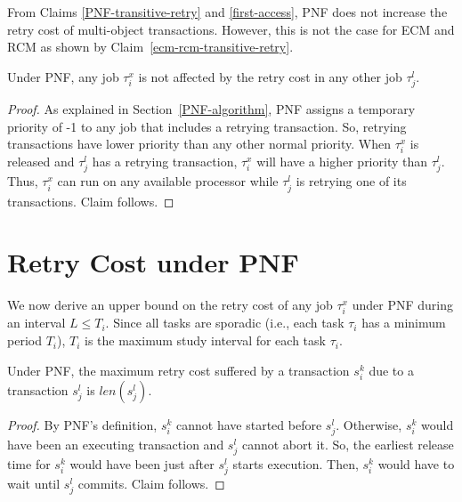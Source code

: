 From Claims \ref{PNF-transitive-retry} and \ref{first-access}, PNF does not increase the retry cost of multi-object transactions. However, this is not the case for ECM and RCM as shown by Claim~\ref{ecm-rcm-transitive-retry}. 

\begin{clm}\label{higher retry does not affect response}
Under PNF, any job $\tau_{i}^{x}$ is not affected by the retry cost in any other
job $\tau_{j}^{l}$.
\end{clm}
\begin{proof}\normalfont
As explained in Section~\ref{PNF-algorithm}, PNF assigns a temporary priority of -1 to any job that includes a retrying transaction. So, retrying transactions have lower priority than any other normal priority.
When $\tau_{i}^{x}$ is released and $\tau_j^l$ has a retrying transaction, $\tau_i^x$ will have a higher priority
than $\tau_j^l$. Thus, $\tau_i^x$ can run on any available processor while $\tau_j^l$ is retrying one of its transactions. Claim follows.
\end{proof}


\section{Retry Cost under PNF}\label{rc pnf sec}

We now derive an upper bound on the retry cost of any job $\tau_i^x$ under PNF during an interval $L\le T_i$. Since all tasks are sporadic (i.e., each task $\tau_i$ has a minimum period $T_i$), $T_i$ is the maximum study interval for each task $\tau_i$.

\begin{clm}\label{two transactions retry cost PNF}
Under PNF, the maximum retry cost suffered by a transaction $s_{i}^{k}$ due 
to a transaction $s_{j}^{l}$ is $len(s_{j}^{l})$.
\end{clm}
\begin{proof}\normalfont
By PNF's definition, $s_{i}^{k}$ cannot have started before
$s_{j}^{l}$. Otherwise, $s_i^k$ would have been an executing transaction and $s_{j}^{l}$ cannot abort it. So, the earliest release time for $s_{i}^{k}$ would have been just after $s_{j}^{l}$ starts execution. Then, $s_i^k$ would have to wait until $s_{j}^{l}$
commits. Claim follows.
\end{proof}

